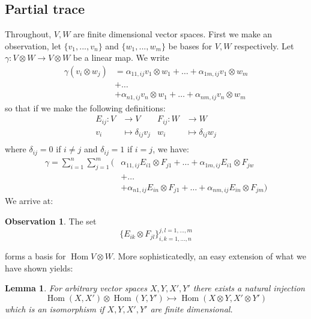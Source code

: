 \documentclass[12pt]{article}
\theoremstyle{plain}
\newtheorem{lemma}[thm]{Lemma}
\theoremstyle{definition}
\newtheorem{observation}[thm]{Observation}
\newcommand{\lto}{\longrightarrow}
\begin{document}
	\subsection{Partial trace}
	Throughout, $V,W$ are finite dimensional vector spaces. First we make an observation, let $\lbrace v_1,...,v_n
	\rbrace$ and $\lbrace w_1,...,w_m\rbrace$ be bases for $V,W$ respectively. Let $\gamma: V \otimes W \lto V \otimes W$ be a linear map. We write
	\begin{align*}
		\gamma(v_i \otimes w_j) &= \alpha_{11,ij}v_1 \otimes w_1 + \hdots + \alpha_{1m,ij}v_1 \otimes w_m\\
		&+ \hdots\\
		&+ \alpha_{n1,ij}v_n \otimes w_1 + \hdots + \alpha_{nm,ij}v_n \otimes w_m
	\end{align*}
	so that if we make the following definitions:
	\begin{align*}
		E_{ij}: V &\lto V & F_{ij}: W &\lto W\\
		v_i &\longmapsto \delta_{ij}v_j & w_i &\longmapsto \delta_{ij}w_j\\
	\end{align*}
	where $\delta_{ij} = 0$ if $i \neq j$ and $\delta_{ij} = 1$ if $i = j$, we have:
	\begin{align*}
		\gamma = \sum_{i = 1}^n\sum_{j = 1}^m\Big(&\alpha_{11,ij}E_{i1}\otimes F_{j1} + \hdots + \alpha_{1m,ij}E_{i1} \otimes F_{jw}\\
		&+ \hdots\\
		&+ \alpha_{n1,ij}E_{in} \otimes F_{j1} + \hdots + \alpha_{nm,ij}E_{in} \otimes F_{jm}\Big)
	\end{align*}
	We arrive at: 
	\begin{observation}\label{obs:basis}
		The set
		\begin{equation}
			\lbrace E_{ik} \otimes F_{jl}\rbrace_{i,k = 1,...,n}^{j,l =1,...,m}
		\end{equation}
	\end{observation}
	forms a basis for $\operatorname{Hom}V \otimes W$. More sophisticatedly, an easy extension of what we have shown yields:
	\begin{lemma}\label{lem:embedding_tensor}
		For arbitrary vector spaces $X,Y,X',Y'$ there exists a natural injection
		\begin{equation}
			\operatorname{Hom}(X,X') \otimes \operatorname{Hom}(Y,Y') \rightarrowtail \operatorname{Hom}(X \otimes Y, X'\otimes Y')
		\end{equation}
		which is an isomorphism if $X,Y,X',Y'$ are finite dimensional.
	\end{lemma}
\end{document}
